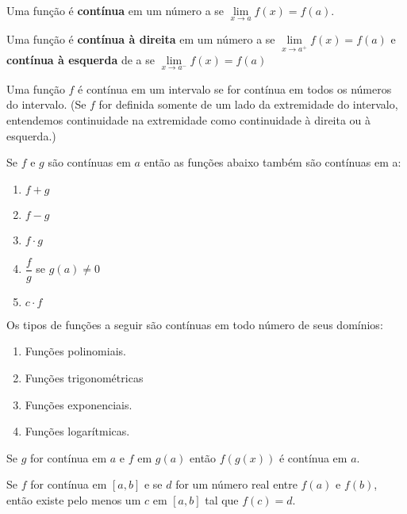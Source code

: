 \begin{tcolorbox}
\begin{defi}Uma função é \textbf{contínua} em um número a se $\lim\limits_{x \to a}f(x)=f(a)$.
\end{defi}
\begin{defi}Uma função é \textbf{contínua à direita} em  um número a se $\lim\limits_{x \to a^+}f(x)=f(a)$ e \textbf{contínua à esquerda} de a se $\lim\limits_{x \to a^-}f(x)=f(a)$ 
\end{defi}
\begin{defi}
Uma função $f$ é contínua em um intervalo se for contínua em todos
os números do intervalo. (Se $f$ for definida somente de um lado da extremidade do intervalo, entendemos continuidade na extremidade como continuidade à direita ou à esquerda.)
\end{defi}

\begin{teorema}\label{operacoes}Se $f$ e $g$ são contínuas em $a$ então as funções abaixo também são contínuas em a:
\begin{multicols}{3}
\begin{enumerate}
    \item $f+g$
    \item $f-g$
    \item $f\cdot g$
    \item $\dfrac{f}{g}$ se $g(a)\neq 0$
    \item $c\cdot f$
\end{enumerate}
\end{multicols}
\end{teorema}
\begin{teorema}\label{todas} Os tipos de funções a seguir são contínuas em todo número de seus domínios:
\begin{multicols}{2}
\begin{enumerate}
    \item Funções polinomiais. 
    \item Funções trigonométricas 
    \item Funções exponenciais.
    \item Funções logarítmicas.
\end{enumerate}
\end{multicols}
\end{teorema}
\begin{teorema}\label{composta}
Se $g$ for contínua em $a$ e $f$ em $g(a)$  então $f(g(x))$ é contínua em $a$.
\end{teorema}
\end{tcolorbox}

\begin{tcolorbox}
\begin{teorema}Se $f$ for contínua em $[a,b]$ e se $d$ for um número real entre $f(a)$ e $f(b)$, então existe pelo menos um $c$ em $[a,b]$ tal que $f(c)=d$.
\end{teorema}
\begin{figure}[H]
    \centering
    
\end{figure}
\end{tcolorbox}